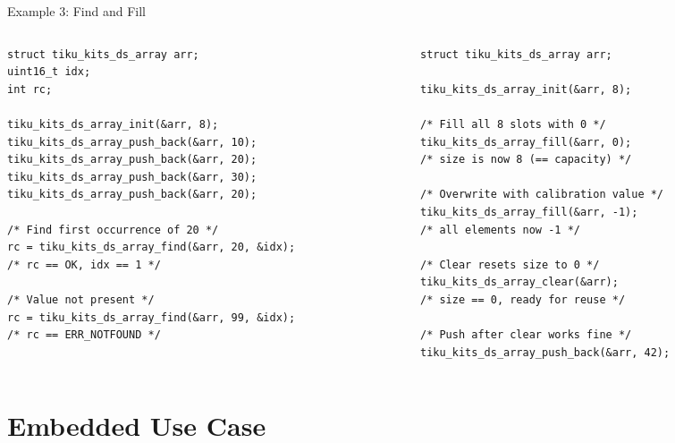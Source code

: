 \documentclass[aspectratio=169, 10pt]{beamer}
\begin{document}
\begin{frame}[fragile]{Example 3: Find and Fill}
\begin{columns}[T]
\begin{column}{0.48\textwidth}
\begin{lstlisting}[style=cstyle,
  title={Linear search with find()}]
struct tiku_kits_ds_array arr;
uint16_t idx;
int rc;

tiku_kits_ds_array_init(&arr, 8);
tiku_kits_ds_array_push_back(&arr, 10);
tiku_kits_ds_array_push_back(&arr, 20);
tiku_kits_ds_array_push_back(&arr, 30);
tiku_kits_ds_array_push_back(&arr, 20);

/* Find first occurrence of 20 */
rc = tiku_kits_ds_array_find(&arr, 20, &idx);
/* rc == OK, idx == 1 */

/* Value not present */
rc = tiku_kits_ds_array_find(&arr, 99, &idx);
/* rc == ERR_NOTFOUND */
\end{lstlisting}
\end{column}

\begin{column}{0.48\textwidth}
\begin{lstlisting}[style=cstyle,
  title={Bulk fill and clear}]
struct tiku_kits_ds_array arr;

tiku_kits_ds_array_init(&arr, 8);

/* Fill all 8 slots with 0 */
tiku_kits_ds_array_fill(&arr, 0);
/* size is now 8 (== capacity) */

/* Overwrite with calibration value */
tiku_kits_ds_array_fill(&arr, -1);
/* all elements now -1 */

/* Clear resets size to 0 */
tiku_kits_ds_array_clear(&arr);
/* size == 0, ready for reuse */

/* Push after clear works fine */
tiku_kits_ds_array_push_back(&arr, 42);
\end{lstlisting}
\end{column}
\end{columns}
\end{frame}

\section{Embedded Use Case}
\end{document}
